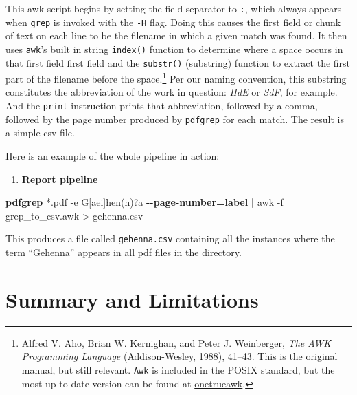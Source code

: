 \documentclass[
  letterpaper,
]{tufte-handout}
\newenvironment{Shaded}{\begin{snugshade}}{\end{snugshade}}
\newcommand{\AttributeTok}[1]{\textcolor[rgb]{0.00,0.34,0.68}{#1}}
\newcommand{\ExtensionTok}[1]{\textcolor[rgb]{0.00,0.58,1.00}{\textbf{#1}}}
\newcommand{\FunctionTok}[1]{\textcolor[rgb]{0.39,0.29,0.61}{#1}}
\newcommand{\KeywordTok}[1]{\textcolor[rgb]{0.12,0.11,0.11}{\textbf{#1}}}
\newcommand{\NormalTok}[1]{\textcolor[rgb]{0.12,0.11,0.11}{#1}}
\newcommand{\OperatorTok}[1]{\textcolor[rgb]{0.12,0.11,0.11}{#1}}
\newcommand{\PreprocessorTok}[1]{\textcolor[rgb]{0.00,0.43,0.16}{#1}}
\newcommand{\StringTok}[1]{\textcolor[rgb]{0.75,0.01,0.01}{#1}}
\providecommand{\tightlist}{%
  \setlength{\itemsep}{0pt}\setlength{\parskip}{0pt}}
\begin{document}
This awk script begins by setting the field separator to \texttt{:},
which always appears when \texttt{grep} is invoked with the \texttt{-H}
flag. Doing this causes the first field or chunk of text on each line to
be the filename in which a given match was found. It then uses
\texttt{awk}'s built in string \texttt{index()} function to determine
where a space occurs in that first field first field and the
\texttt{substr()} (substring) function to extract the first part of the
filename before the space.\footnote{Alfred V. Aho, Brian W. Kernighan,
  and Peter J. Weinberger, \emph{The AWK Programming Language}
  (Addison-Wesley, 1988), 41--43. This is the original manual, but still
  relevant. \texttt{Awk} is included in the POSIX standard, but the most
  up to date version can be found at
  \href{https://github.com/onetrueawk/awk}{onetrueawk}.} Per our naming
convention, this substring constitutes the abbreviation of the work in
question: \emph{HdE} or \emph{SdF}, for example. And the \texttt{print}
instruction prints that abbreviation, followed by a comma, followed by
the page number produced by \texttt{pdfgrep} for each match. The result
is a simple csv file.

Here is an example of the whole pipeline in action:

\begin{enumerate}
\def\labelenumi{(\arabic{enumi})}
\setcounter{enumi}{8}
\tightlist
\item
  \textbf{Report pipeline}
\end{enumerate}

\begin{Shaded}
\begin{Highlighting}[]
 \ExtensionTok{pdfgrep} \PreprocessorTok{*}\NormalTok{.pdf }\AttributeTok{{-}e} \StringTok{\textquotesingle{}G[aei]hen(n)?a\textquotesingle{}}
  \ExtensionTok{{-}{-}page{-}number=label}  \KeywordTok{|} \FunctionTok{awk} \AttributeTok{{-}f}\NormalTok{ grep\_to\_csv.awk }\OperatorTok{\textgreater{}}\NormalTok{ gehenna.csv}
\end{Highlighting}
\end{Shaded}

This produces a file called \texttt{gehenna.csv} containing all the
instances where the term ``Gehenna'' appears in all pdf files in the
directory.

\section{Summary and Limitations}\label{summary-and-limitations}
\end{document}
